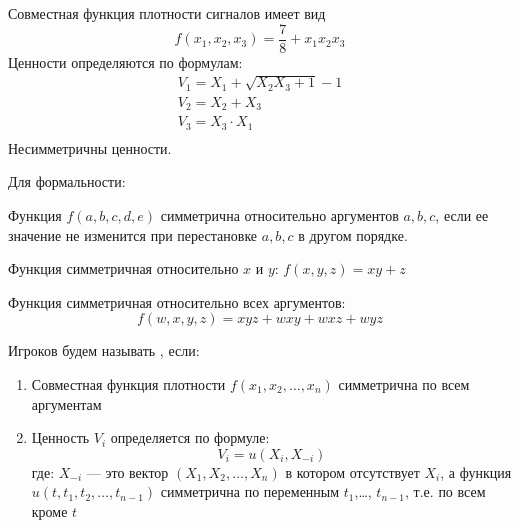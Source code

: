 \begin{myex} Совместная функция плотности сигналов имеет вид
\begin{equation}
f(x_{1},x_{2},x_{3})=\frac{7}{8}+x_{1}x_{2}x_{3}
\end{equation}
Ценности определяются по формулам:
\begin{equation}
\begin{array}{c}
V_{1}=X_{1}+\sqrt{X_{2}X_{3}+1}-1 \\
V_{2}=X_{2}+X_{3} \\
V_{3}=X_{3}\cdot X_{1} \\
\end{array}
\end{equation}
Несимметричны ценности.
\end{myex}

Для формальности:
\begin{mydef}
Функция $ f(a,b,c,d,e) $ симметрична относительно аргументов $ a,b,c $, если ее значение не изменится при перестановке $ a,b,c $ в другом порядке.
\end{mydef}

\begin{myex} Функция симметричная относительно $ x $ и $ y $: $ f(x,y,z)=xy+z $
\end{myex}

\begin{myex} Функция симметричная относительно всех аргументов: 
$$ f(w,x,y,z)=xyz+wxy+wxz+wyz $$
\end{myex}


\begin{mydef} Игроков будем называть , если:
\begin{enumerate}
\item Совместная функция плотности $ f(x_{1},x_{2},\ldots,x_{n}) $ симметрична по всем аргументам
\item Ценность $V_{i}$ определяется по формуле:
\begin{equation}
V_{i}=u(X_{i},X_{-i})
\end{equation}
где: $X_{-i}  $ --- это вектор $ (X_{1},X_{2},\ldots,X_{n}) $ в котором отсутствует $ X_{i} $, а  функция $ u(t,t_{1},t_{2},\ldots,t_{n-1}) $ симметрична по переменным $ t_{1} $,\ldots, $ t_{n-1} $, т.е. по всем кроме $ t $

\end{enumerate}
\end{mydef}

